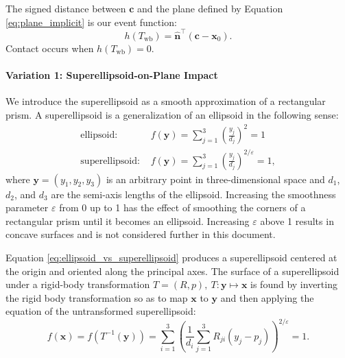\documentclass[]{article}
\newcommand{\transpose}{^{\top}}
\newcommand{\colvec}[1]{\mathbf{#1}}
\theoremstyle{definition}
\theoremstyle{remark}
\begin{document}
The signed distance between $\colvec{c}$ and the plane defined by Equation \eqref{eq:plane_implicit} is our event function:
\begin{equation}\label{eq:event_function_dist_from_plane}
	h\left(T_\mathrm{wb}\right) = \hat{\colvec{n}}\transpose\left(\colvec{c} - \colvec{x}_0\right).
\end{equation}
Contact occurs when $h(T_\mathrm{wb}) = 0$.

\paragraph{Variation 1: Superellipsoid-on-Plane Impact}
We introduce the superellipsoid as a smooth approximation of a rectangular prism.
A superellipsoid is a generalization of an ellipsoid in the following sense:
\begin{align}\label{eq:ellipsoid_vs_superellipsoid}
	\textrm{ellipsoid:~}&f(\colvec{y}) = \sum_{j=1}^{3} \left(\frac{y_j}{d_j}\right)^2 = 1\\
	\textrm{superellipsoid:~}&f(\colvec{y}) = \sum_{j=1}^{3} \left(\frac{y_j}{d_j}\right)^{2/\varepsilon} = 1,
\end{align}
where $\colvec{y} = \left(y_1,y_2,y_3\right)$ is an arbitrary point in three-dimensional space and $d_1$, $d_2$, and $d_3$ are the semi-axis lengths of the ellipsoid.
Increasing the smoothness parameter $\varepsilon$ from 0 up to 1 has the effect of smoothing the corners of a rectangular prism until it becomes an ellipsoid.
Increasing $\varepsilon$ above 1 results in concave surfaces and is not considered further in this document.

Equation \eqref{eq:ellipsoid_vs_superellipsoid} produces a superellipsoid centered at the origin and oriented along the principal axes.
The surface of a superellipsoid under a rigid-body transformation $T = \left(R,p\right),~T: \colvec{y}\mapsto\colvec{x}$ is found by inverting the rigid body transformation so as to map $\colvec{x}$ to $\colvec{y}$ and then applying the equation of the untransformed superellipsoid:
\begin{equation}
	f(\colvec{x}) = f\left(T^{-1}\left(\colvec{y}\right)\right) = \sum_{i=1}^{3}\left(\frac{1}{d_i}\sum_{j=1}^{3}R_{ji}\left(y_j - p_j\right)\right)^{2/\varepsilon} = 1.
\end{equation}
\end{document}
